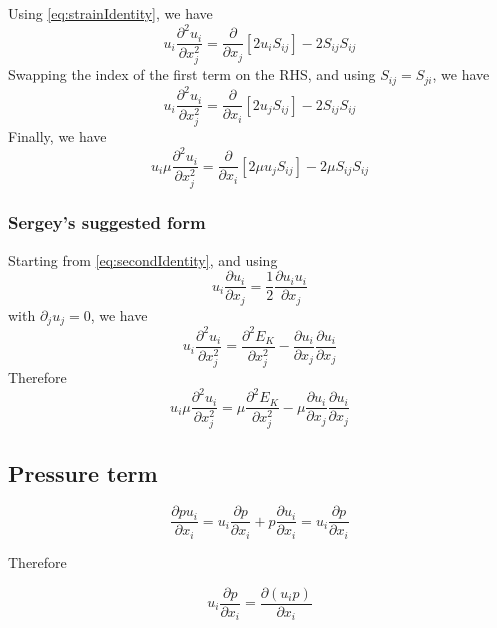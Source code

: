 \documentclass[11pt]{article}
\newcommand{\PD}{\partial}
\begin{document}
Using \ref{eq:strainIdentity}, we have
\begin{equation}
	u_i \frac{\PD^2 u_i}{\PD x_j^2} =
	\frac{\PD}{\PD x_j} \left[ 2 u_i S_{ij} \right] -
	2 S_{ij} S_{ij}
\end{equation}
Swapping the index of the first term on the RHS, and using $S_{ij}=S_{ji}$, we have
\begin{equation}
	u_i \frac{\PD^2 u_i}{\PD x_j^2} =
	\frac{\PD}{\PD x_i} \left[ 2 u_j S_{ij} \right] -
	2 S_{ij} S_{ij}
\end{equation}
Finally, we have
\begin{equation}
	\boxed{
	u_i \mu \frac{\PD^2 u_i}{\PD x_j^2} =
	\frac{\PD}{\PD x_i} \left[ 2 \mu u_j S_{ij} \right] -
	2 \mu S_{ij} S_{ij}
	}
\end{equation}

\subsubsection{Sergey's suggested form}
Starting from \ref{eq:secondIdentity}, and using
\begin{equation}
	u_i \frac{\PD u_i}{\PD x_j} =
	\frac{1}{2} \frac{\PD u_i u_i}{\PD x_j}
\end{equation}
with $\PD_j u_j = 0$, we have
\begin{equation}
	u_i \frac{\PD^2 u_i}{\PD x_j^2} =
	\frac{\PD^2 E_K}{\PD x_j^2} -
	\frac{\PD u_i}{\PD x_j}\frac{\PD u_i}{\PD x_j}
\end{equation}
Therefore
\begin{equation}
	\boxed{
	u_i \mu \frac{\PD^2 u_i}{\PD x_j^2} =
	\mu \frac{\PD^2 E_K}{\PD x_j^2} -
	\mu \frac{\PD u_i}{\PD x_j}\frac{\PD u_i}{\PD x_j}
	}
\end{equation}

\subsection{Pressure term}
\begin{equation}
	\frac{\PD p u_i}{\PD x_i}
	=
	u_i \frac{\PD p}{\PD x_i}
	+
	p \frac{\PD u_i}{\PD x_i}
	=
	u_i \frac{\PD p}{\PD x_i}
\end{equation}

Therefore

\begin{equation}
	\boxed{
	u_i \frac{\PD p}{\PD x_i} =
	\frac{\PD (u_i p)}{\PD x_i}
	}
\end{equation}
\end{document}
